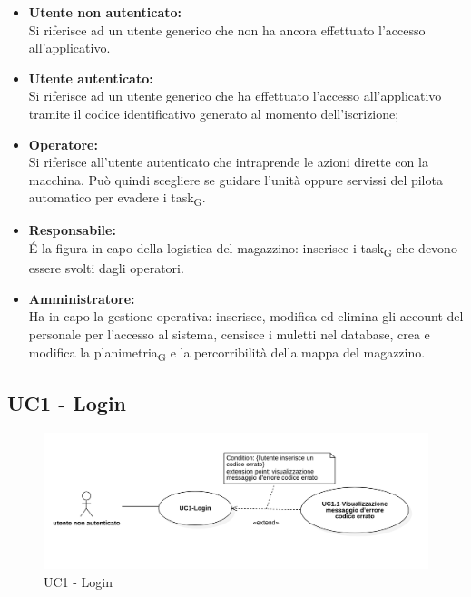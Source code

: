 \begin{itemize}
	\item{\textbf{Utente non autenticato:}\\
	Si riferisce ad un utente generico che non ha ancora effettuato l'accesso all'applicativo.}
	\item{\textbf{Utente autenticato:}\\
	Si riferisce ad un utente generico che ha effettuato l'accesso all'applicativo tramite il codice identificativo generato al momento dell'iscrizione;}
	\item{\textbf{Operatore:}\\
	Si riferisce all'utente autenticato che intraprende le azioni dirette con la macchina. Può quindi scegliere se guidare l'unità oppure servissi del pilota automatico per evadere i task\textsubscript{G}.}
	\item{\textbf{Responsabile:}\\
	 \'E la figura in capo della logistica del magazzino: inserisce i task\textsubscript{G} che devono essere svolti dagli operatori.}
	\item{\textbf{Amministratore:}\\
 Ha in capo la gestione operativa: inserisce, modifica ed elimina gli account del personale per l'accesso al sistema, censisce i muletti nel database, crea e modifica la planimetria\textsubscript{G} e la percorribilità della mappa del magazzino.}
\end{itemize}

\subsection{UC1 - Login}
\begin{figure}[H]
	\centering
	\includegraphics[scale=0.52]{res/images/uc1.png}
	\caption{UC1 - Login}
\end{figure}


